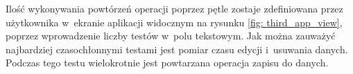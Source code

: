 Ilość wykonywania powtórzeń operacji poprzez pętle zostaje zdefiniowana przez użytkownika w~ekranie aplikacji widocznym na rysunku \ref{fig: third_app_view}, poprzez wprowadzenie liczby testów w~polu tekstowym. Jak można zauważyć najbardziej czasochłonnymi testami jest pomiar czasu edycji i~usuwania danych. Podczas tego testu wielokrotnie jest powtarzana operacja zapisu do danych.